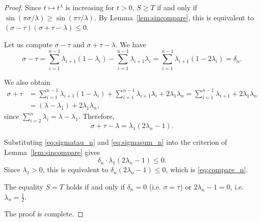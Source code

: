 \documentclass[10pt,a4paper]{amsart}
\begin{document}
\begin{proof}
Since $t\mapsto t^\lambda$ is increasing for $t>0$, $S\geq T$ if and only if
$\sin(\pi\sigma/\lambda)\geq\sin(\pi\tau/\lambda)$.
By Lemma~\ref{lem:sincompare}, this is equivalent to
$(\sigma-\tau)(\sigma+\tau-\lambda)\leq 0$.

\medskip
Let us compute $\sigma-\tau$ and $\sigma+\tau-\lambda$. We have
\begin{equation}\label{eq:sigmatau_n}
  \sigma-\tau
  =\sum_{i=1}^{n-1}\lambda_{i+1}(1-\lambda_i)-\sum_{i=1}^{n-1}\lambda_{i+1}\lambda_i
  =\sum_{i=1}^{n-1}\lambda_{i+1}(1-2\lambda_i)
  =\delta_n.
\end{equation}

\medskip
We also obtain
\begin{align*}
  \sigma+\tau
  &=\sum_{i=1}^{n-1}\lambda_{i+1}(1-\lambda_i)+\sum_{i=1}^{n-1}\lambda_{i+1}\lambda_i
   +2\lambda_1\lambda_n
  =\sum_{i=1}^{n-1}\lambda_{i+1}+2\lambda_1\lambda_n\\
  &=(\lambda-\lambda_1)+2\lambda_1\lambda_n,
\end{align*}
since $\sum_{i=2}^n\lambda_i=\lambda-\lambda_1$.  Therefore,
\begin{equation}\label{eq:sigmasum_n}
  \sigma+\tau-\lambda = \lambda_1(2\lambda_n-1).
\end{equation}

\medskip
Substituting \eqref{eq:sigmatau_n} and \eqref{eq:sigmasum_n} into
the criterion of Lemma~\ref{lem:sincompare} gives
\[
  \delta_n\cdot\lambda_1(2\lambda_n-1)\leq 0.
\]
Since $\lambda_1>0$, this is equivalent to $\delta_n(2\lambda_n-1)\leq 0$,
which is \eqref{eq:compare_n}.

The equality $S=T$ holds if and only if $\delta_n=0$ (i.e. $\sigma=\tau$) or
$2\lambda_n-1=0$, i.e. $\lambda_n=\tfrac12$.  

The proof is complete.
\end{proof}
\end{document}
